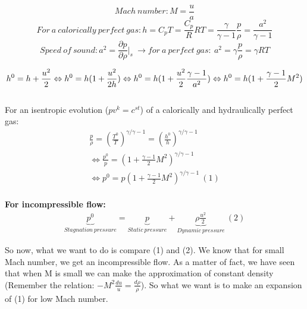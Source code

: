\begin{equation}
Mach\ number: M=\frac{u}{a}
\end{equation}
\begin{equation}
For\ a\ calorically\ perfect\ gas: h=C_pT=\frac{C_p}{R}RT=\frac{\gamma}{\gamma-1}\frac{p}{\rho}=\frac{a^2}{\gamma -1} 
\end{equation}
\begin{equation}
Speed\ of\ sound: a^2=\frac{\partial p}{\partial \rho}|_s \ \rightarrow for\ a\ perfect\ gas:\ a^2=\gamma \frac{p}{\rho}=\gamma RT
\end{equation}

\begin{equation}
 h^0=h+\frac{u^2}{2} \Leftrightarrow h^0=h(1+\frac{u^2}{2h}) \Leftrightarrow h^0=h(1+\frac{u^2}{2} \frac{\gamma -1}{a^2}) \\
 \Leftrightarrow h^0=h(1+ \frac{\gamma -1}{2} M^2) 
\end{equation}
\\

For an isentropic evolution ($pv^k=c^{st}$) of a calorically and hydraulically perfect gas:
\begin{equation}
\begin{aligned}
\frac{p}{\rho}=(\frac{T^0}{T})^{\gamma/\gamma-1}=(\frac{h^0}{h})^{\gamma/\gamma-1} \\
\Leftrightarrow \frac{p^0}{p}=(1+\frac{\gamma-1}{2}M^2)^{\gamma/\gamma-1} \\
\Leftrightarrow p^0=p(1+\frac{\gamma-1}{2}M^2)^{\gamma/\gamma-1}\ (1)
\end{aligned}
\end{equation}
\\

\textbf{For incompressible flow:}
\begin{equation}
\begin{aligned}
\underbrace{p^0}_{Stagnation\ pressure}=\underbrace{p}_{Static\ pressure}+\underbrace{\rho\frac{u^2}{2}}_{Dynamic\ pressure} \ (2)
\end{aligned}
\end{equation}

So now, what we want to do is compare (1) and (2). We know that for small Mach number, we get an incompressible flow. As a matter of fact, we have seen that when M is small we can make the approximation of constant density (Remember the relation: $-M^2\frac{du}{u}=\frac{d\rho}{\rho}$). So what we want is to make an expansion of (1) for low Mach number.

